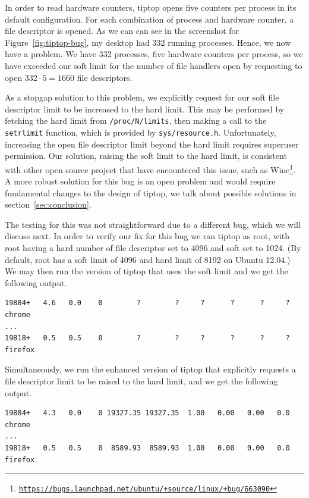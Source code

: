 In order to read hardware counters, tiptop opens five counters per process in its default configuration.
For each combination of process and hardware counter, a file descriptor is opened.
As we can can see in the screenshot for Figure~\ref{fig:tiptop-bug}, my desktop had 332 running processes.
Hence, we now have a problem.
We have 332 processes, five hardware counters per process, so we have exceeded our soft limit for the number of file handlers open by requesting to open $332\cdot 5 = 1660$ file descriptors.

As a stopgap solution to this problem, we explicitly request for our soft file descriptor limit to be increased to the hard limit. This may be performed by fetching the hard limit from \texttt{/proc/N/limits}, then making a call to the \texttt{setrlimit} function, which is provided by \texttt{sys/resource.h}.
Unfortunately, increasing the open file descriptor limit beyond the hard limit requires superuser permission.
Our solution, raising the soft limit to the hard limit, is consistent with other open source project that have encountered this issue, such as Wine\footnote{\texttt{\url{https://bugs.launchpad.net/ubuntu/+source/linux/+bug/663090}}}.
A more robust solution for this bug is an open problem and would require fundamental changes to the design of tiptop, we talk about possible solutions in section~\ref{sec:conclusion}.

The testing for this was not straightforward due to a different bug, which we will discuss next.
In order to verify our fix for this bug we ran tiptop as root, with root having a hard number of file descriptor set to 4096 and soft set to 1024. (By default, root has a soft limit of 4096 and hard limit of 8192 on Ubuntu 12.04.)
We may then run the version of tiptop that uses the soft limit and we get the following output.
\begin{verbatim}
19884+   4.6   0.0    0        ?        ?     ?      ?      ?     ? chrome
...
19818+   0.5   0.5    0        ?        ?     ?      ?      ?     ? firefox
\end{verbatim}

Simultaneously, we run the enhanced version of tiptop that explicitly requests a file descriptor limit to be raised to the hard limit, and we get the following output.
\begin{verbatim}
19884+   4.3   0.0    0 19327.35 19327.35  1.00   0.00   0.00   0.0 chrome
...
19818+   0.5   0.5    0  8589.93  8589.93  1.00   0.00   0.00   0.0 firefox
\end{verbatim}


